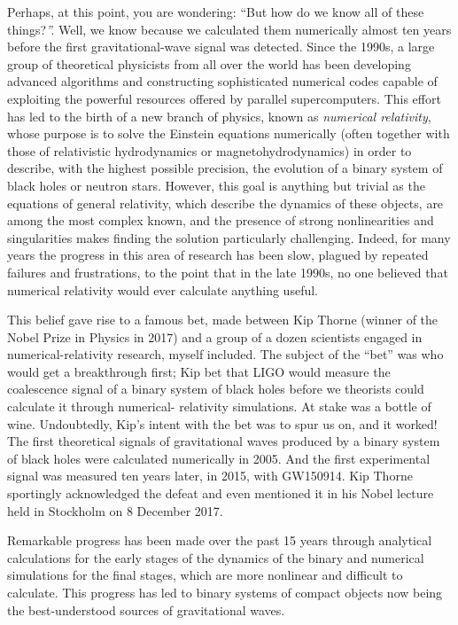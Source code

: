 Perhaps, at this point, you are wondering: ``But how do we know all of these
things?\emph{''.} Well, we know because we calculated them numerically almost ten years
before the first gravitational-wave signal was detected. Since the 1990s, a large group
of theoretical physicists from all over the world has been developing advanced
algorithms and constructing sophisticated numerical codes capable of exploiting the
powerful resources offered by parallel supercomputers. This effort
has led to the birth of a new branch of physics, known as \emph{numerical
relativity}, whose purpose is to solve the Einstein equations
numerically (often together with those of relativistic hydrodynamics
or magnetohydrodynamics) in order to describe, with the highest possible precision, the
evolution of a binary system of black holes or neutron stars. However, this goal is
anything but trivial as the equations of general relativity, which describe the dynamics
of these objects, are among the most complex known, and the presence of strong
nonlinearities and singularities makes finding the solution particularly challenging.
Indeed, for many years the progress in this area of research has been slow, plagued by
repeated failures and frustrations, to the point that in the late 1990s, no one believed
that numerical relativity would ever calculate anything useful.

This belief gave rise to a famous bet, made between Kip Thorne
(winner of the Nobel Prize in Physics in 2017) and a group of a dozen scientists engaged
in numerical-relativity research, myself included. The subject of the ``bet'' was who
would get a breakthrough first; Kip bet that LIGO would measure the coalescence signal
of a binary system of black holes before we theorists could calculate it through
numerical- relativity simulations. At stake was a bottle of wine. Undoubtedly, Kip's
intent with the bet was to spur us on, and it worked! The first theoretical signals of
gravitational waves produced by a binary system of black holes were calculated
numerically in 2005. And the first experimental signal was measured ten years later, in
2015, with GW150914. Kip Thorne sportingly
acknowledged the defeat and even mentioned it in his Nobel lecture held in Stockholm on
8 December 2017.

Remarkable progress has been made over the past 15 years through analytical calculations
for the early stages of the dynamics of the binary and numerical simulations for the
final stages, which are more nonlinear and difficult to calculate. This progress has led
to binary systems of compact objects now being the best-understood sources of
gravitational waves.


